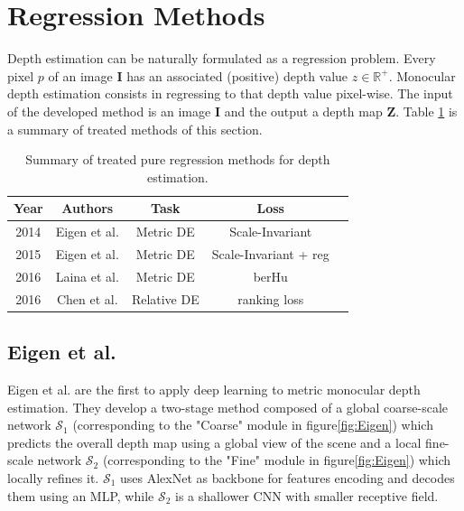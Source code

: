 \section{Regression Methods}
Depth estimation can be naturally formulated as a regression problem.
Every pixel $p$ of an image $\mathbf{I}$ has an associated (positive) depth value $z \in \mathbb{R}^{+}$.
Monocular depth estimation consists in regressing to that depth value pixel-wise.
The input of the developed method is an image $\mathbf{I}$ and the output a depth map $\mathbf{Z}$.
Table \ref{table:1} is a summary of treated methods of this section.

\label{sec:regression_methods}

\begin{table}
	\centering
	\begin{tabular}{| c | c | c | c | c |}
		\hline
		\textbf{Year} & \textbf{Authors} & \textbf{Task} & \textbf{Loss} \\
		\hline
		2014 & Eigen et al. \cite{Eigen} & Metric DE & Scale-Invariant \\
		2015 & Eigen et al. \cite{Eigen2} & Metric DE & Scale-Invariant + reg \\
		2016 & Laina et al. \cite{Laina} & Metric DE & berHu \\
		2016 & Chen et al. \cite{DIW} & Relative DE & ranking loss \\
		\hline
	\end{tabular}
	\caption{Summary of treated pure regression methods for depth estimation. \label{table:1}}
\end{table}

\subsection{Eigen et al.}
Eigen et al. \cite{Eigen} are the first to apply deep learning to metric monocular depth estimation.
They develop a two-stage method composed of a global coarse-scale network $\mathcal{S}_{1}$ (corresponding to the "Coarse" module in figure\ref{fig:Eigen}) which predicts the overall depth map using a global view of the scene and a local fine-scale network $\mathcal{S}_{2}$ (corresponding to the "Fine" module in figure\ref{fig:Eigen}) which locally refines it.
$\mathcal{S}_{1}$ uses AlexNet \cite{AlexNet} as backbone for features encoding and decodes them using an MLP, while $\mathcal{S}_{2}$ is a shallower CNN with smaller receptive field.


